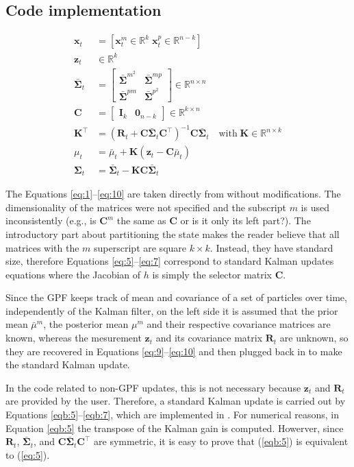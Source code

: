 \documentclass[a4paper]{article}
\numberwithin{equation}{section}
\newcommand{\x}{\mathbf{x}}
\newcommand{\z}{\mathbf{z}}
\newcommand{\cov}{\boldsymbol{\Sigma}}
\newcommand{\bcov}{\bar{\cov}}
\newcommand{\C}{\mathbf{C}}
\newcommand{\I}[1]{\mathbf{I}_{#1}}
\newcommand{\Zero}[1]{\boldsymbol{0}_{#1}}
\newcommand{\Real}{\mathbb{R}}
\newcommand{\K}{\mathbf{K}}
\newcommand{\R}{\mathbf{R}}
\newcommand{\transpose}{{\intercal}}
\newcommand{\inverse}{{-1}}
\begin{document}
\begin{paracol}{2}
\section{Code implementation \cite{pronto}}
\begin{align}
  \x_t &= [ \x_t^m \in \Real^{k} \; \x_t^p\in\Real^{n-k} ]  \label{eqb:1}\\
 \z_t &\in \Real^k \label{eqb:2}\\
   \bar{\cov}_t &= \begin{bmatrix}
                  \bcov^{m^2} & \bcov^{mp} \\
                  \bcov^{pm} & \bcov^{p^2}
                 \end{bmatrix} \in \Real^{n \times n}\label{eqb:3}\\
 \C &= \begin{bmatrix} \I{k} & \Zero{n-k} \end{bmatrix} \in \Real^{k\times n}
\label{eqb:4}\\
 \K^\transpose &= (\R_t + \C \bcov_t \C^\transpose)^\inverse \C \bcov_t\quad
\text{with}\;
\K \in \Real^{n\times k} \label{eqb:5}\\
 \mu_t &= \bar{\mu}_t + \K (\z_t - \C\bar{\mu}_t) \label{eqb:6}\\
 \cov_t &= \bcov_t - \K \C \bcov_t \label{eqb:7}
\end{align}

\end{paracol}
The Equations \ref{eq:1}--\ref{eq:10} are taken directly from
\cite{bry2015ijrr} without modifications. The dimensionality of the matrices
were not specified and the subscript $m$ is used inconsistently (e.g., is
$\C^m$ the same as $\C$ or is it only its left part?).
The introductory part about partitioning the state makes the reader believe
that all matrices with the $m$ superscript are square $k \times k$. Instead,
they have standard size, therefore Equations \ref{eq:5}--\ref{eq:7} correspond
to standard Kalman updates equations where the Jacobian of $h$ is simply the
selector matrix $\C$.

Since the GPF keeps track of mean and covariance of a set of particles over
time, independently of the Kalman filter, on the left side it is assumed that
the prior mean $\bar{\mu}^m$, the posterior mean $\mu^m$ and their respective
covariance matrices are known, whereas the mesurement $\z_t$ and its covariance
matrix $\R_t$ are unknown, so they are recovered in Equations
\ref{eq:9}--\ref{eq:10} and then plugged back in to make the standard Kalman
update.

In the code related to non-GPF updates, this is not necessary because $\z_t$
and $\R_t$ are provided by the user. Therefore, a standard Kalman update is
carried out by Equations \ref{eqb:5}--\ref{eqb:7}, which are implemented in
\cite{pronto}.
For numerical reasons, in Equation \ref{eqb:5} the transpose of the Kalman
gain is computed. Howerver, since $\R_t$, $\bcov_t$, and
$\C\bcov_t\C^\transpose$ are symmetric, it is easy to prove that (\ref{eqb:5})
is equivalent to (\ref{eq:5}).


\end{document}
